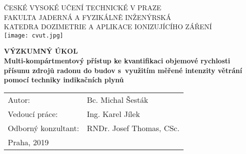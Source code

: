 \begin{center}
{\LARGE ČESKÉ VYSOKÉ UČENÍ TECHNICKÉ V PRAZE\\}
	\vspace{10pt}
{\large FAKULTA JADERNÁ A FYZIKÁLNĚ INŽENÝRSKÁ\\}
{\large KATEDRA DOZIMETRIE A APLIKACE IONIZUJÍCÍHO ZÁŘENÍ\\}
	\vspace{40pt}
    \texttt{[image: cvut.jpg]}

	\vspace{40pt}
{\Huge \textbf{VÝZKUMNÝ ÚKOL\\}}
	\vspace{10pt}
{\LARGE \textbf{Multi-kompártmentový přístup ke kvantifikaci  objemové rychlosti přísunu zdrojů radonu do budov s využitím měřené intenzity větrání pomocí techniky indikačních plynů\\}}
	\vspace*{\fill}

\end{center}
{\large
\begin{tabular}{p{5cm} p{8cm}}
Autor: & Bc. Michal Šesták\\
Vedoucí práce: & Ing. Karel Jílek\\
Odborný konzultant: & RNDr. Josef Thomas, CSc.\\
Praha, 2019 & \\
\end{tabular}
}
\newpage

\newpage
\vspace*{\fill}
